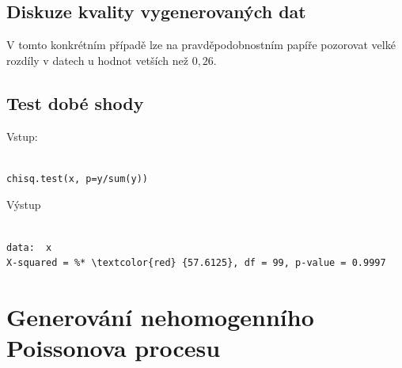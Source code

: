 \documentclass[12pt]{article}
\begin{document}
\subsection{Diskuze kvality vygenerovaných dat}
\begin{footnotesize}
\color{black}
V tomto konkrétním případě lze na pravděpodobnostním papíře pozorovat velké rozdíly v datech u hodnot vetších než $0,26$.
\end{footnotesize}

\subsection{Test dobé shody}
Vstup:
 \begin{lstlisting}[frame=single]  % Start your code-block
  
chisq.test(x, p=y/sum(y)) 
\end{lstlisting}
Výstup
 \begin{lstlisting}[frame=single]  % Start your code-block
  
data:  x
X-squared = %* \textcolor{red} {57.6125}, df = 99, p-value = 0.9997
\end{lstlisting}

\section{Generování nehomogenního Poissonova procesu}
\end{document}
